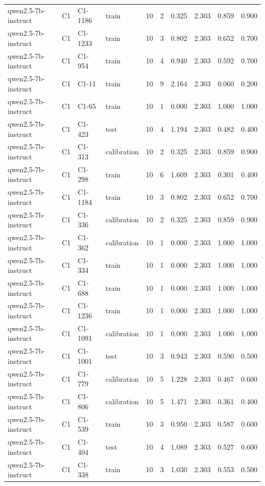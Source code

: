 \begin{table}
\begin{tabular}{llllrrrrrr}
qwen2.5-7b-instruct & C1 & C1-1186 & train & 10 & 2 & 0.325 & 2.303 & 0.859 & 0.900 \\
qwen2.5-7b-instruct & C1 & C1-1233 & train & 10 & 3 & 0.802 & 2.303 & 0.652 & 0.700 \\
qwen2.5-7b-instruct & C1 & C1-954 & train & 10 & 4 & 0.940 & 2.303 & 0.592 & 0.700 \\
qwen2.5-7b-instruct & C1 & C1-11 & train & 10 & 9 & 2.164 & 2.303 & 0.060 & 0.200 \\
qwen2.5-7b-instruct & C1 & C1-65 & train & 10 & 1 & 0.000 & 2.303 & 1.000 & 1.000 \\
qwen2.5-7b-instruct & C1 & C1-423 & test & 10 & 4 & 1.194 & 2.303 & 0.482 & 0.400 \\
qwen2.5-7b-instruct & C1 & C1-313 & calibration & 10 & 2 & 0.325 & 2.303 & 0.859 & 0.900 \\
qwen2.5-7b-instruct & C1 & C1-298 & train & 10 & 6 & 1.609 & 2.303 & 0.301 & 0.400 \\
qwen2.5-7b-instruct & C1 & C1-1184 & train & 10 & 3 & 0.802 & 2.303 & 0.652 & 0.700 \\
qwen2.5-7b-instruct & C1 & C1-336 & calibration & 10 & 2 & 0.325 & 2.303 & 0.859 & 0.900 \\
qwen2.5-7b-instruct & C1 & C1-362 & calibration & 10 & 1 & 0.000 & 2.303 & 1.000 & 1.000 \\
qwen2.5-7b-instruct & C1 & C1-334 & train & 10 & 1 & 0.000 & 2.303 & 1.000 & 1.000 \\
qwen2.5-7b-instruct & C1 & C1-688 & train & 10 & 1 & 0.000 & 2.303 & 1.000 & 1.000 \\
qwen2.5-7b-instruct & C1 & C1-1236 & train & 10 & 1 & 0.000 & 2.303 & 1.000 & 1.000 \\
qwen2.5-7b-instruct & C1 & C1-1091 & calibration & 10 & 1 & 0.000 & 2.303 & 1.000 & 1.000 \\
qwen2.5-7b-instruct & C1 & C1-1001 & test & 10 & 3 & 0.943 & 2.303 & 0.590 & 0.500 \\
qwen2.5-7b-instruct & C1 & C1-779 & calibration & 10 & 5 & 1.228 & 2.303 & 0.467 & 0.600 \\
qwen2.5-7b-instruct & C1 & C1-806 & calibration & 10 & 5 & 1.471 & 2.303 & 0.361 & 0.400 \\
qwen2.5-7b-instruct & C1 & C1-539 & train & 10 & 3 & 0.950 & 2.303 & 0.587 & 0.600 \\
qwen2.5-7b-instruct & C1 & C1-404 & test & 10 & 4 & 1.089 & 2.303 & 0.527 & 0.600 \\
qwen2.5-7b-instruct & C1 & C1-338 & train & 10 & 3 & 1.030 & 2.303 & 0.553 & 0.500 \\

\end{tabular}
\end{table}
